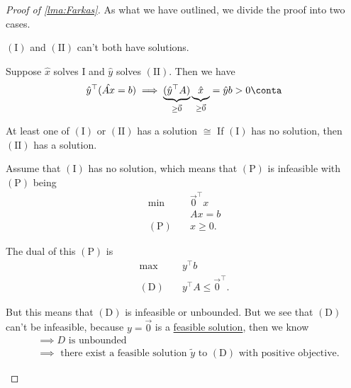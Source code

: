 \begin{proof}[Proof of \autoref{lma:Farkas}]
	As what we have outlined, we divide the proof into two cases.
	\begin{claim}
		\((\mathrm{I})\) and \((\mathrm{II})\) can't both have solutions.
	\end{claim}
	\begin{explanation}
		Suppose \(\hat{x}\) solves I and \(\hat{y}\) solves \((\mathrm{II})\). Then we have
		\[
			\hat{y}^{\top}(\hat{Ax} = b) \implies \underbrace{(\hat{y}^{\top} A)}_{\geq  \vec{0}}\underbrace{\vphantom{\hat{y}^{\top}}\hat{x}}_{\geq  \vec{0}} = \hat{y} b > 0\conta
		\]
	\end{explanation}
	\begin{claim}
		At least one of \((\mathrm{I})\) or \((\mathrm{II})\) has a solution \(\cong\) If \((\mathrm{I})\) has no solution, then \((\mathrm{II})\) has a solution.
	\end{claim}
	\begin{explanation}
		Assume that \((\mathrm{I})\) has no solution, which means that \((\mathrm{P})\) is infeasible with \((\mathrm{P})\) being
		\[
			\begin{aligned}
				\min~             & \vec{0}^{\top} x \\
				                  & Ax = b           \\
				(\mathrm{P})\quad & x\geq 0.
			\end{aligned}
		\]

		The dual of this \((\mathrm{P})\) is
		\[
			\begin{aligned}
				\max~             & y^{\top}b                       \\
				(\mathrm{D})\quad & y^{\top} A \leq \vec{0}^{\top}.
			\end{aligned}
		\]

		But this means that \((\mathrm{D})\) is infeasible or unbounded. But we see that \((\mathrm{D})\) can't be infeasible, because \(y = \vec{0}\) is a \hyperref[def:feasible-solution]{feasible solution}, then we know
		\[
			\begin{split}
				&\implies D \text{ is unbounded} \\
				&\implies \text{ there exist a feasible solution \(\widetilde{y}\) to \((\mathrm{D})\) with positive objective}.
			\end{split}
		\]
	\end{explanation}
\end{proof}

